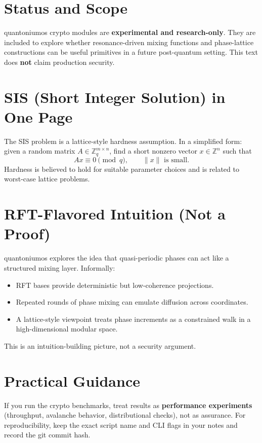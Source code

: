 \documentclass[11pt, a4paper, openany]{book}
\theoremstyle{definition}
\begin{document}
\section{Status and Scope}
quantoniumos crypto modules are \textbf{experimental and research-only}. They are included to explore whether resonance-driven mixing functions and phase-lattice constructions can be useful primitives in a future post-quantum setting. This text does \textbf{not} claim production security.

\section{SIS (Short Integer Solution) in One Page}
The SIS problem is a lattice-style hardness assumption. In a simplified form: given a random matrix $A\in\mathbb{Z}_q^{m\times n}$, find a short nonzero vector $x\in\mathbb{Z}^n$ such that
\begin{equation}
Ax \equiv 0 \pmod q,\qquad \|x\| \text{ is small}.
\end{equation}
Hardness is believed to hold for suitable parameter choices and is related to worst-case lattice problems.

\section{RFT-Flavored Intuition (Not a Proof)}
quantoniumos explores the idea that quasi-periodic phases can act like a structured mixing layer. Informally:
\begin{itemize}
    \item RFT bases provide deterministic but low-coherence projections.
    \item Repeated rounds of phase mixing can emulate diffusion across coordinates.
    \item A lattice-style viewpoint treats phase increments as a constrained walk in a high-dimensional modular space.
\end{itemize}
This is an intuition-building picture, not a security argument.

\section{Practical Guidance}
If you run the crypto benchmarks, treat results as \textbf{performance experiments} (throughput, avalanche behavior, distributional checks), not as assurance. For reproducibility, keep the exact script name and CLI flags in your notes and record the git commit hash.
\end{document}
